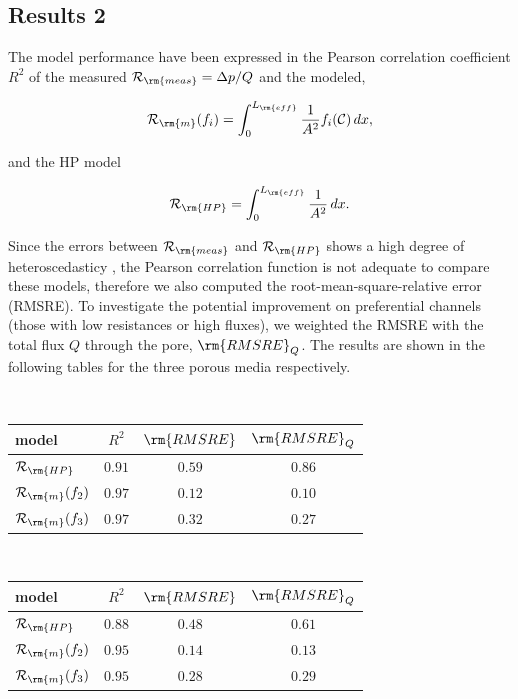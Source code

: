 \documentclass[draft,jgrga]{agutexSI2019}
\begin{document}
\begin{article}
 
\subsection{Results 2}

The model performance have been expressed in the Pearson correlation coefficient $R^2$ of the measured $\mathcal{R}_{\rm{meas}}= \Delta p/Q$ and the modeled,

\begin{equation}
	\mathcal{R}_{\rm{m}}(f_i) = \int^{L_{\rm{eff}}}_{0}\frac{1}{A^2}f_i(\mathcal{C})\,dx,
\end{equation}

and the HP model 

\begin{equation}
	\mathcal{R}_{\rm{HP}} = \int^{L_{\rm{eff}}}_{0}\frac{1}{A^2}\,dx.
\end{equation}

Since the errors between $\mathcal{R}_{\rm{meas}}$ and $\mathcal{R}_{\rm{HP}}$ shows a high degree of heteroscedasticy \cite{wilcox_comparing_2009}, the Pearson correlation function is not adequate to compare these models, therefore we also computed the root-mean-square-relative error (RMSRE). To investigate the potential improvement on preferential channels (those with low resistances or high fluxes), we weighted the RMSRE with the total flux $Q$ through the pore, $\rm{RMSRE}_Q$. The results are shown in the following tables for the three porous media respectively. 

\\
\begin{tabular}{l|c|c|c}
\hline
model & $R^2$  & $\rm{RMSRE}$ & $\rm{RMSRE}_Q$  \\
\hline
$\mathcal{R}_{\rm{HP}}$ 	& $0.91$ & $0.59$ & $0.86$\\
$\mathcal{R}_{\rm{m}}(f_2)$	& $0.97$ & $0.12$ & $0.10$\\
$\mathcal{R}_{\rm{m}}(f_3)$	& $0.97$ & $0.32$ & $0.27$\\
\end{tabular}

\vspace{1cm}

\\
\begin{tabular}{l|c|c|c}
\hline
model & $R^2$  & $\rm{RMSRE}$ & $\rm{RMSRE}_Q$  \\
\hline
$\mathcal{R}_{\rm{HP}}$ 	& $0.88$ & $0.48$ & $0.61$\\
$\mathcal{R}_{\rm{m}}(f_2)$	& $0.95$ & $0.14$ & $0.13$\\
$\mathcal{R}_{\rm{m}}(f_3)$	& $0.95$ & $0.28$ & $0.29$\\
\end{tabular}


\end{article}
\end{document}
